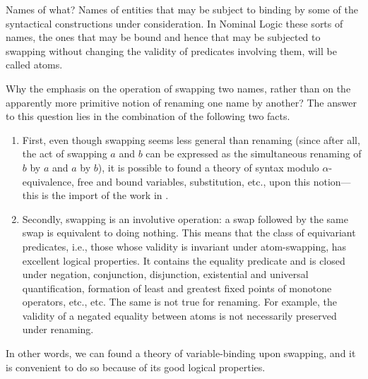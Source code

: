 \documentclass[english, mgr]{iithesis}
\begin{document}
\begin{mdframed}[frametitle={Pitts, 2003\cite{pitts2003}}]
Names of what? Names of entities that may be subject to binding by some of
the syntactical constructions under consideration. In Nominal Logic these sorts of
names, the ones that may be bound and hence that may be subjected to swapping
without changing the validity of predicates involving them, will be called atoms.
\end{mdframed}
\begin{mdframed}[frametitle={Pitts, 2003\cite{pitts2003}}]
Why the emphasis on the operation of swapping two names, rather than on the
apparently more primitive notion of renaming one name by another? The answer
to this question lies in the combination of the following two facts.

\begin{enumerate}
  \item First, even though swapping seems less general than renaming (since after all,
  the act of swapping \(a\) and \(b\) can be expressed as the simultaneous renaming
  of \(b\) by \(a\) and \(a\) by \(b\)), it is possible to found a theory of syntax modulo
  \(\alpha\)-equivalence, free and bound variables, substitution, etc., upon this notion—
  this is the import of the work in \cite{subnbinders}.
  \item Secondly, swapping is an involutive operation: a swap followed by the same
  swap is equivalent to doing nothing. This means that the class of equivariant
  predicates, i.e., those whose validity is invariant under atom-swapping, has
  excellent logical properties. It contains the equality predicate and is closed
  under negation, conjunction, disjunction, existential and universal quantification,
  formation of least and greatest fixed points of monotone operators, etc., etc.
  The same is not true for renaming. For example, the validity of a
  negated equality between atoms is not necessarily preserved under renaming.
\end{enumerate}

In other words, we can found a theory of variable-binding upon swapping, and it
is convenient to do so because of its good logical properties.
\end{mdframed}
\end{document}

